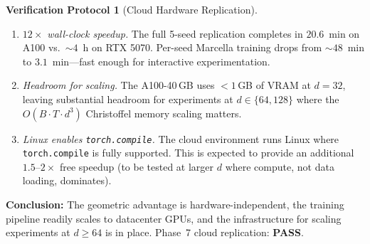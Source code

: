 \documentclass[11pt,a4paper]{article}
\theoremstyle{definition}
\newtheorem{protocol}[theorem]{Verification Protocol}
\theoremstyle{remark}
\begin{document}
\begin{protocol}[Cloud Hardware Replication]
\begin{enumerate}[nosep]
  \item \emph{$12\times$ wall-clock speedup.} The full 5-seed 
  replication completes in $20.6$~min on A100 vs.\ ${\sim}4$~h 
  on RTX 5070. Per-seed Marcella training drops from 
  ${\sim}48$~min to $3.1$~min---fast enough for interactive 
  experimentation.

  \item \emph{Headroom for scaling.} The A100-40\,GB uses 
  $<1$\,GB of VRAM at $d = 32$, leaving substantial headroom 
  for experiments at $d \in \{64, 128\}$ where the 
  $O(B \cdot T \cdot d^3)$ Christoffel memory scaling matters.

  \item \emph{Linux enables \texttt{torch.compile}.} The cloud 
  environment runs Linux where \texttt{torch.compile} is fully 
  supported. This is expected to provide an additional 
  $1.5$--$2\times$ free speedup (to be tested at larger $d$ 
  where compute, not data loading, dominates).
\end{enumerate}

\textbf{Conclusion:} The geometric advantage is hardware-independent, 
the training pipeline readily scales to datacenter GPUs, and the 
infrastructure for scaling experiments at $d \geq 64$ is in place. 
Phase~7 cloud replication: \textbf{PASS}.
\end{protocol}
\end{document}
